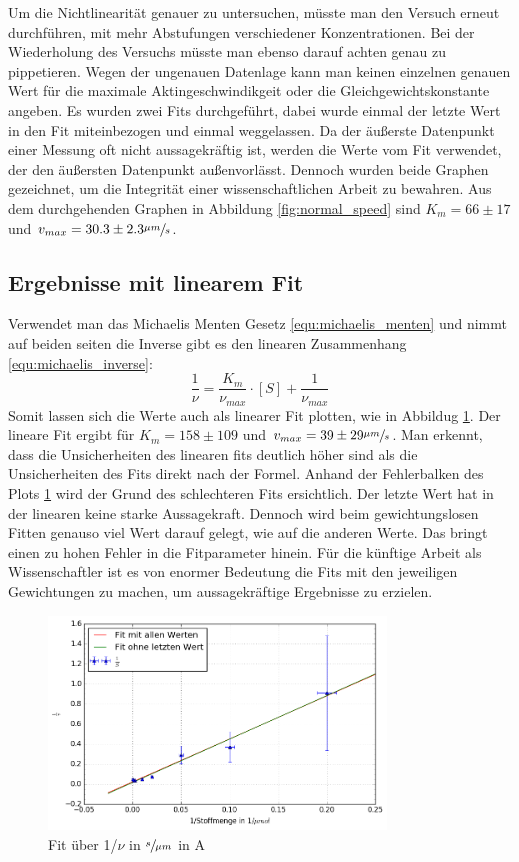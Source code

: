 Um die Nichtlinearität genauer zu untersuchen, müsste man den Versuch erneut durchführen, 
mit mehr Abstufungen verschiedener Konzentrationen.
Bei der Wiederholung des Versuchs müsste man ebenso darauf achten genau zu pippetieren.
Wegen der ungenauen Datenlage kann man keinen einzelnen genauen Wert für die maximale
Aktingeschwindikgeit oder die Gleichgewichtskonstante angeben.
Es wurden zwei Fits durchgeführt, dabei wurde einmal der letzte Wert in den Fit miteinbezogen und einmal weggelassen.
Da der äußerste Datenpunkt einer Messung oft nicht aussagekräftig ist,
werden die Werte vom Fit verwendet, der den äußersten Datenpunkt außenvorlässt.
Dennoch wurden beide Graphen gezeichnet, um die Integrität einer wissenschaftlichen Arbeit zu bewahren.
Aus dem durchgehenden Graphen in Abbildung \ref{fig:normal_speed} sind $K_m = 66 \pm 17$ und $v_{max} = 30.3 \pm 2.3 \sfrac{\mu m}{s}$.
\subsection{Ergebnisse mit linearem Fit}
Verwendet man das Michaelis Menten Gesetz \ref{equ:michaelis_menten} und nimmt auf beiden seiten die
Inverse gibt es den linearen Zusammenhang \ref{equ:michaelis_inverse}:
\begin{equation}
  \frac{1}{\nu} = \frac{K_m}{\nu_{max}} \cdot [S] + \frac{1}{\nu_{max}}
  \label{equ:michaelis_inverse}
\end{equation}
Somit lassen sich die Werte auch als linearer Fit plotten, wie in Abbildug \ref{fig:1_over_speed}.
Der lineare Fit ergibt für $K_m = 158 \pm 109$ und $v_{max} = 39 \pm 29 \sfrac{\mu m}{s}$.
Man erkennt, dass die Unsicherheiten des linearen fits
deutlich höher sind als die Unsicherheiten des Fits direkt nach der Formel.
Anhand der Fehlerbalken des Plots \ref{fig:1_over_speed} wird der Grund des schlechteren Fits ersichtlich.
Der letzte Wert hat in der linearen keine starke Aussagekraft.
Dennoch wird beim gewichtungslosen Fitten genauso viel Wert darauf gelegt, wie auf die anderen Werte.
Das bringt einen zu hohen Fehler in die Fitparameter hinein.
Für die künftige Arbeit als Wissenschaftler ist es von enormer Bedeutung die Fits mit den jeweiligen
Gewichtungen zu machen, um aussagekräftige Ergebnisse zu erzielen.
\begin{figure}[]
  \centering
  \includegraphics[width=0.8\textwidth]{bilder/both_fits_1over.png}
  \caption{Fit über 1/$\nu$  in $\sfrac{s}{\mu m}$ in A}
  \label{fig:1_over_speed}
\end{figure}

